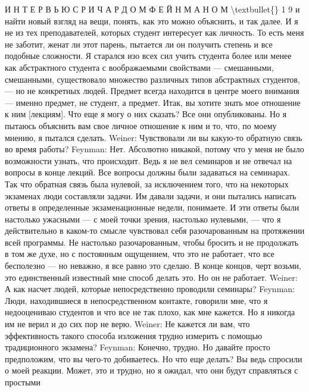\documentclass[10pt,oneside]{article}
\begin{document}
И Н Т Е Р В Ь Ю  С  Р И Ч А Р Д О М  Ф Е Й Н М А Н О М \textbackslash{}textbullet\{\} 1 9 и найти новый взгляд на вещи, понять, как это можно объяснить, и так далее. И я не из тех преподавателей, которых студент интересует как личность. То есть меня не заботит, женат ли этот парень, пытается ли он получить степень и все подобные сложности. Я старался изо всех сил учить студента более или менее как абстрактного студента с воображаемыми свойствами --- смешанными, смешанными, существовало множество различных типов абстрактных студентов, --- но не конкретных людей. Предмет всегда находится в центре моего внимания --- именно предмет, не студент, а предмет. Итак, вы хотите знать мое отношение к ним [лекциям]. Что еще я могу о них сказать? Все они опубликованы. Но я пытаюсь объяснить вам свое личное отношение к ним и то, что, по моему мнению, я пытался сделать. Weiner: Чувствовали ли вы какую-то обратную связь во время работы? Feynman: Нет. Абсолютно никакой, потому что у меня не было возможности узнать, что происходит. Ведь я не вел семинаров и не отвечал на вопросы в конце лекций. Все вопросы должны были задаваться на семинарах. Так что обратная связь была нулевой, за исключением того, что на некоторых экзаменах люди составляли задачи. Им давали задачи, и они пытались написать ответы в определенные экзаменационные недели, понимаете. И эти ответы были настолько ужасными --- с моей точки зрения, настолько нулевыми, --- что я действительно в каком-то смысле чувствовал себя разочарованным на протяжении всей программы. Не настолько разочарованным, чтобы бросить и не продолжать в том же духе, но с постоянным ощущением, что это не работает, что все бесполезно --- но неважно, я все равно это сделаю. В конце концов, черт возьми, это единственный известный мне способ делать это. Но он не работает. Weiner: А как насчет людей, которые непосредственно проводили семинары? Feynman: Люди, находившиеся в непосредственном контакте, говорили мне, что я недооцениваю студентов и что все не так плохо, как мне кажется. Но я никогда им не верил и до сих пор не верю. Weiner: Не кажется ли вам, что эффективность такого способа изложения трудно измерить с помощью традиционного экзамена? Feynman: Конечно, трудно. Но давайте просто предположим, что вы чего-то добиваетесь. Но что еще делать? Вы ведь спросили о моей реакции. Может, это и трудно, но я ожидал, что они будут справляться с простыми\par
\end{document}
